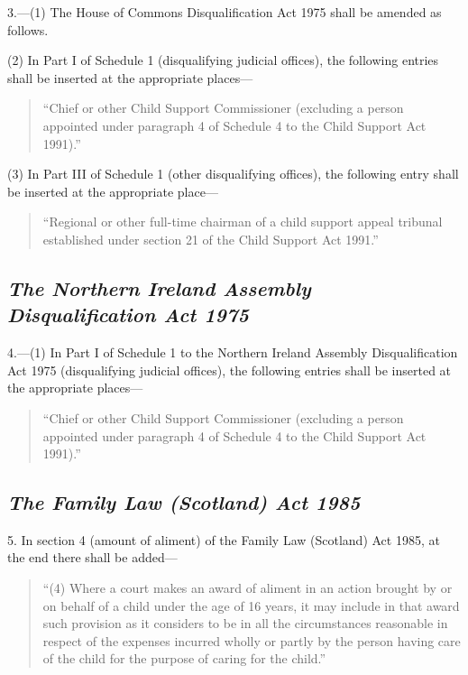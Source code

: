 \documentclass[12pt,a4paper]{article}
\begin{document}
3.---(1) The House of Commons Disqualification Act 1975 shall be amended as follows.

(2) In Part I 
of Schedule 1  %
(disqualifying judicial offices), the following entries shall be inserted at the appropriate places— 
\begin{quotation}
“Chief or other Child Support Commissioner (excluding a person appointed under paragraph 4 of Schedule 4 to the Child Support Act 1991).''
\end{quotation}

(3) In Part III 
of Schedule 1  %
(other disqualifying offices), the following entry shall be inserted at the appropriate place— 
\begin{quotation}
“Regional or other full-time chairman of a child support appeal tribunal established under section 21 of the Child Support Act 1991.''
\end{quotation}


\subsection*{\itshape The Northern Ireland Assembly Disqualification Act 1975}

4.---(1) In Part I of 
Schedule 1 to  %
the Northern Ireland Assembly Disqualification Act 1975 (disqualifying judicial offices), the following entries shall be inserted at the appropriate places— 
\begin{quotation}
“Chief or other Child Support Commissioner (excluding a person appointed under paragraph 4 of Schedule 4 to the Child Support Act 1991).''
\end{quotation}


\subsection*{\itshape The Family Law (Scotland) Act 1985}

5. In section 4 (amount of aliment) of the Family Law (Scotland) Act 1985, at the end there shall be added—
\begin{quotation}
“(4) Where a court makes an award of aliment in an action brought by or on behalf of a child under the age of 16 years, it may include in that award such provision as it considers to be in all the circumstances reasonable in respect of the expenses incurred wholly or partly by the person having care of the child for the purpose of caring for the child.”
\end{quotation}
\end{document}
